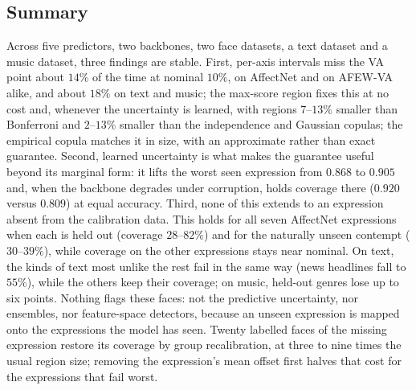 \begin{table}[h]
  \centering\small
  
  \caption{DEAM (music; openSMILE features; nominal $90\%$, fixed split).
  Top: mean over five seeds (ensembles combine them); Area: Bonferroni area
  relative to the max-score region; Worst genre: lowest max-score joint coverage
  across the seven genres. Bottom: each genre held out from training and
  calibration in turn, all of its songs used for testing (evidential head,
  three seeds). In training: max-score coverage on that genre's test songs in
  the main runs. Others: max-score coverage on the remaining test songs.}
  \label{tab:deam}
\end{table}

\subsection{Summary}
Across five predictors, two backbones, two face datasets, a text dataset and
a music dataset, three findings are stable. First, per-axis intervals miss the VA point about $14\%$ of the time at
nominal $10\%$, on AffectNet and on AFEW-VA alike, and about $18\%$ on
text and music; the max-score region fixes
this at no cost and, whenever the uncertainty is learned, with regions
$7$--$13\%$ smaller than Bonferroni and $2$--$13\%$ smaller than the
independence and Gaussian copulas; the empirical copula matches it in size,
with an approximate rather than exact guarantee. Second, learned uncertainty is what makes
the guarantee useful beyond its marginal form: it lifts the worst seen
expression from $0.868$ to $0.905$ and, when the backbone degrades under
corruption, holds coverage there ($0.920$ versus $0.809$) at equal accuracy.
Third, none of this extends to an expression absent from the calibration data.
This holds for all seven AffectNet expressions when each is held out (coverage
$28$--$82\%$) and for the naturally unseen contempt ($30$--$39\%$), while
coverage on the other expressions stays near nominal. On text, the kinds of
text most unlike the rest fail in the same way (news headlines fall to
$55\%$), while the others keep their coverage; on music, held-out genres
lose up to six points. Nothing flags these
faces: not the predictive uncertainty, nor ensembles, nor feature-space
detectors, because an unseen expression is mapped onto the expressions the
model has seen. Twenty labelled faces of the missing expression restore its
coverage by group recalibration, at three to nine times the usual region size;
removing the expression's mean offset first halves that cost for the
expressions that fail worst.
